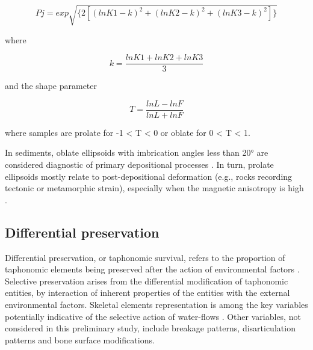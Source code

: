 \documentclass[review,times,authoryear]{elsarticle} %
\begin{document}
$$Pj=exp\sqrt{\{2[(lnK1-k)^2+(lnK2-k)^2+(lnK3-k)^2]\}}$$

where

$$k=\frac{lnK1+lnK2+lnK3}{3}$$

and the shape parameter

$$T=\frac{lnL-lnF}{lnL+lnF}$$

where samples are prolate for -1 < T < 0 or oblate for 0 < T < 1.

In sediments, oblate ellipsoids with imbrication angles less than 20° are considered diagnostic of primary depositional processes \citep{Hamilton1970,Hrouda1982,Tarling1993,Liu2001,Lanza2006}. In turn, prolate ellipsoids mostly relate to post-depositional deformation (e.g., rocks recording tectonic or metamorphic strain), especially when the magnetic anisotropy is high \citep{Hrouda1976}.

\subsection{Differential preservation}

Differential preservation, or taphonomic survival, refers to the proportion of taphonomic elements being preserved after the action of environmental factors \citep{Fernandez-Lopez2006}. Selective preservation arises from the differential modification of taphonomic entities, by interaction of inherent properties of the entities with the external environmental factors. Skeletal elements representation is among the key variables potentially indicative of the selective action of water-flows \citep[][among others]{Behrensmeyer1975a,Kaufmann2011,Voorhies1969}. Other variables, not considered in this preliminary study, include breakage patterns, disarticulation patterns and bone surface modifications.
\end{document}
